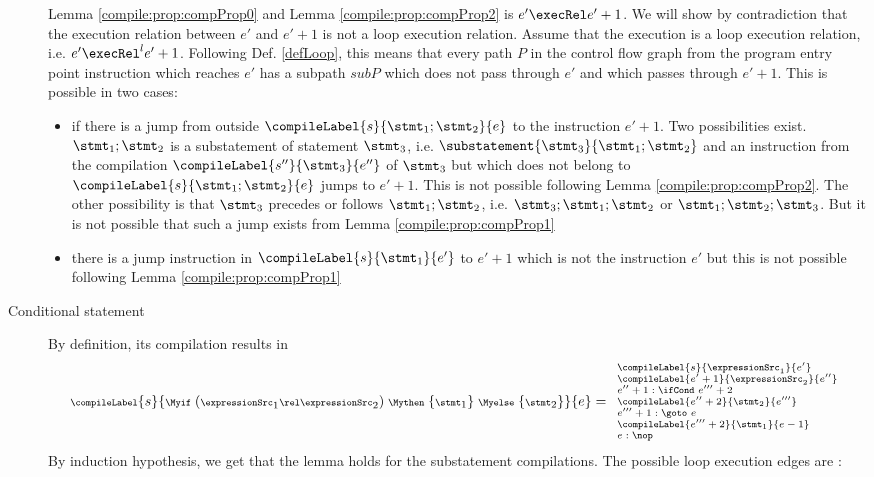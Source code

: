 \begin{description}
  Lemma \ref{compile:prop:compProp0} and Lemma \ref{compile:prop:compProp2}  is
$e' \execRel e'+1$. We will show  by contradiction that the execution relation between $e'$ and $e'+1$ is not a loop execution relation.
Assume that the execution is a loop execution relation, i.e. $e' \execRel^{l} e'+1$. Following Def. \ref{defLoop}, this means that every path $P$ in the control flow graph 
 from the program entry point instruction which reaches $e'$ has a subpath $ subP $ which does not pass through $e'$ and which passes through $e'+1$.
 This is possible in two cases:
\begin{itemize}
\item  if there is a jump from outside $\compileLabel{s}{\stmt_1;\stmt_2}{e}$ to the instruction $e'+1$.
       Two possibilities exist.  $\stmt_1;\stmt_2$ is a substatement of  statement $\stmt_3$, i.e. $\substatement{\stmt_3}{\stmt_1;\stmt_2 }$ 
       and an instruction from the compilation  $\compileLabel{s''}{\stmt_3}{e''}$ of $\stmt_3$ but which does not belong to  $\compileLabel{s}{\stmt_1;\stmt_2}{e}$ 
       jumps to $e'+1$.  This is not possible following Lemma \ref{compile:prop:compProp2}. The other possibility is that $\stmt_3$ precedes or follows
       $\stmt_1;\stmt_2$, i.e. $\stmt_3;\stmt_1;\stmt_2$ or $\stmt_1;\stmt_2;\stmt_3$. But it is not possible that such  a jump exists from Lemma  \ref{compile:prop:compProp1}

\item there is a jump instruction in $\compileLabel{s}{\stmt_1}{e'}$ to  $e'+1$ which is not the instruction $e'$
      but this is not possible following Lemma \ref{compile:prop:compProp1}
\end{itemize}


\item[Conditional statement]
By definition, its compilation results in
  $$ \scriptsize{\compileLabel{s}{ \Myif \ ( \expressionSrc_1 \rel \expressionSrc_2 ) \ \Mythen \ \{ \stmt_1 \} \  \Myelse \ \{ \stmt_2 \}   }{e} = 
\begin{array}{l}
  \compileLabel{s}{\expressionSrc_1}{e'}\\
  \compileLabel{e'+1}{\expressionSrc_2}{e''}\\  
  e'' + 1: \ifCond \ e''' + 2 \\
  \compileLabel{e'' + 2}{\stmt_2}{e'''}\\ 
  e''' + 1: \goto \ e \\ 
  \compileLabel{e''' +  2}{\stmt_1}{ e -1  }\\ 
  e: \nop 
\end{array}}
$$
 By induction hypothesis, we get that the lemma holds for the substatement compilations. The possible loop execution edges are :


\end{description}
